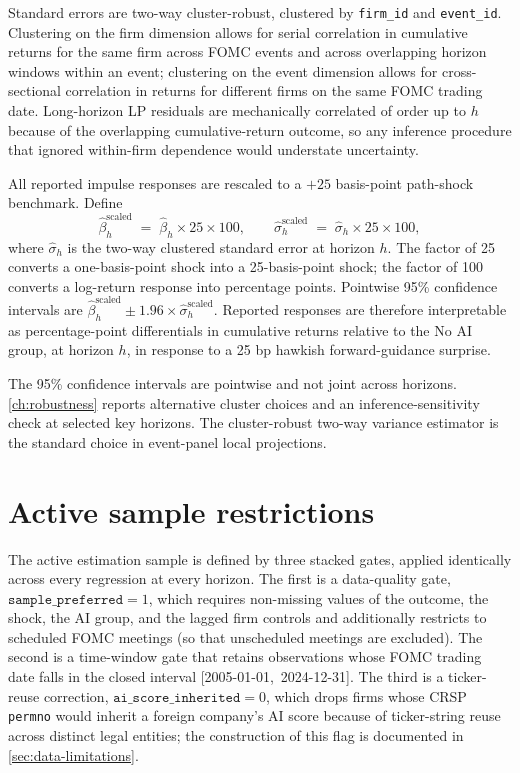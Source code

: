 Standard errors are two-way cluster-robust, clustered by \texttt{firm\_id} and \texttt{event\_id}. Clustering on the firm dimension allows for serial correlation in cumulative returns for the same firm across FOMC events and across overlapping horizon windows within an event; clustering on the event dimension allows for cross-sectional correlation in returns for different firms on the same FOMC trading date. Long-horizon LP residuals are mechanically correlated of order up to $h$ because of the overlapping cumulative-return outcome, so any inference procedure that ignored within-firm dependence would understate uncertainty.

All reported impulse responses are rescaled to a $+25$ basis-point path-shock benchmark. Define
\begin{equation}
    \hat\beta_h^{\text{scaled}} \;=\; \hat\beta_h \times 25 \times 100,
    \qquad
    \hat{\sigma}_h^{\text{scaled}} \;=\; \hat\sigma_h \times 25 \times 100,
    \label{eq:scaling}
\end{equation}
where $\hat\sigma_h$ is the two-way clustered standard error at horizon $h$. The factor of 25 converts a one-basis-point shock into a 25-basis-point shock; the factor of 100 converts a log-return response into percentage points. Pointwise 95\% confidence intervals are $\hat\beta_h^{\text{scaled}} \pm 1.96 \times \hat\sigma_h^{\text{scaled}}$. Reported responses are therefore interpretable as percentage-point differentials in cumulative returns relative to the No AI group, at horizon $h$, in response to a 25 bp hawkish forward-guidance surprise.

The 95\% confidence intervals are pointwise and not joint across horizons. \cref{ch:robustness} reports alternative cluster choices and an inference-sensitivity check at selected key horizons. The cluster-robust two-way variance estimator is the standard choice in event-panel local projections.

\section{Active sample restrictions}
\label{sec:emp-sample}

The active estimation sample is defined by three stacked gates, applied identically across every regression at every horizon. The first is a data-quality gate, $\mathtt{sample\_preferred} = 1$, which requires non-missing values of the outcome, the shock, the AI group, and the lagged firm controls and additionally restricts to scheduled FOMC meetings (so that unscheduled meetings are excluded). The second is a time-window gate that retains observations whose FOMC trading date falls in the closed interval \mbox{[2005-01-01, 2024-12-31]}. The third is a ticker-reuse correction, $\mathtt{ai\_score\_inherited} = 0$, which drops firms whose CRSP \texttt{permno} would inherit a foreign company's AI score because of ticker-string reuse across distinct legal entities; the construction of this flag is documented in \cref{sec:data-limitations}.

